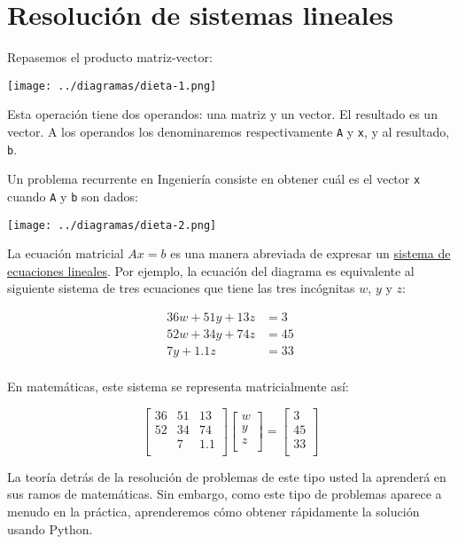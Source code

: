 \section{Resolución de sistemas lineales}

Repasemos el producto matriz-vector:

\texttt{[image: ../diagramas/dieta-1.png]}

Esta operación tiene dos operandos: una matriz y un vector. El resultado
es un vector. A los operandos los denominaremos respectivamente
\lstinline!A! y \lstinline!x!, y al resultado, \lstinline!b!.

Un problema recurrente en Ingeniería consiste en obtener cuál es el
vector \lstinline!x! cuando \lstinline!A! y \lstinline!b! son dados:

\texttt{[image: ../diagramas/dieta-2.png]}

La ecuación matricial \(Ax = b\) es una manera abreviada de expresar un
\href{http://es.wikipedia.org/wiki/Sistema\_de\_ecuaciones\_lineales}{sistema
de ecuaciones lineales}. Por ejemplo, la ecuación del diagrama es
equivalente al siguiente sistema de tres ecuaciones que tiene las tres
incógnitas \(w\), \(y\) y \(z\):

\[\begin{align}
36w + 51y + 13z &= 3 \\
52w + 34y + 74z &= 45 \\
7y + 1.1z &= 33 \\
\end{align}\]

En matemáticas, este sistema se representa matricialmente así:

\[\begin{bmatrix}
36 & 51 & 13 \\
52 & 34 & 74 \\
&  7 & 1.1 \\
\end{bmatrix}
\begin{bmatrix}
w \\ y \\ z \\
\end{bmatrix}
=
\begin{bmatrix}
3 \\ 45 \\ 33 \\
\end{bmatrix}\]

La teoría detrás de la resolución de problemas de este tipo usted la
aprenderá en sus ramos de matemáticas. Sin embargo, como este tipo de
problemas aparece a menudo en la práctica, aprenderemos cómo obtener
rápidamente la solución usando Python.


